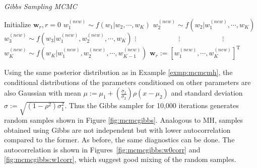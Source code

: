\begin{algorithm}[!b]
\caption{\it Gibbs Sampling MCMC}
\label{algo:mcmcgibbs}
\begin{algorithmic}[1]\vspace{.2cm}
\item Initialize $\mathbf{w}_{r}, r=0$\vspace{.2cm}
\vspace{.2cm}
\State $w_1^{(new)}\sim f(w_1|w_2,\cdots,w_K)$\vspace{.2cm}
\State $w_2^{(new)}\sim f(w_2|w_1^{(new)},\cdots,w_K)$\vspace{.2cm}
\State $w_3^{(new)}\sim f(w_3|w_1^{(new)},w_2^{(new)},\cdots,w_K)$\vspace{.2cm}
\State $\vdots\qquad\qquad\qquad\vdots\qquad\qquad\qquad\vdots$\vspace{.2cm}
\State $w_K^{(new)}\sim f(w_K|w_1^{(new)},w_2^{(new)},\cdots,w_{K-1}^{(new)})$\vspace{.2cm}
\State $\mathbf{w}_r:=[w_1^{(new)},\cdots,w_K^{(new)}]^{\text{T}}$\vspace{.2cm}
\EndFor
\end{algorithmic}
\end{algorithm}
\vspace{-.3cm}
\begin{exmp}\label{exmp:gibbs}
Using the same posterior distribution as in Example \ref{exmp:mcmcmh}, the conditional distributions of the parameters conditioned on other parameters are also Gaussian with mean $\mu:=\mu_1 + \left(\frac{\sigma_1}{\sigma_2}\right)\rho(x - \mu_2)$ and standard deviation $\sigma:=\sqrt{(1 - \rho^2)\sigma_1^2}$. Thus the Gibbs sampler for 10,000 iterations generates random samples shown in Figure \ref{fig:mcmcgibbs}. Analogous to MH, samples obtained using Gibbs are not independent but with lower autocorrelation compared to the former. As before, the same diagnostics can be done. The autocorrelation is shown in \mbox{Figures \ref{fig:mcmcgibbs:w0corr}} and \ref{fig:mcmcgibbs:w1corr}, which suggest good mixing of the random samples.
\end{exmp}
